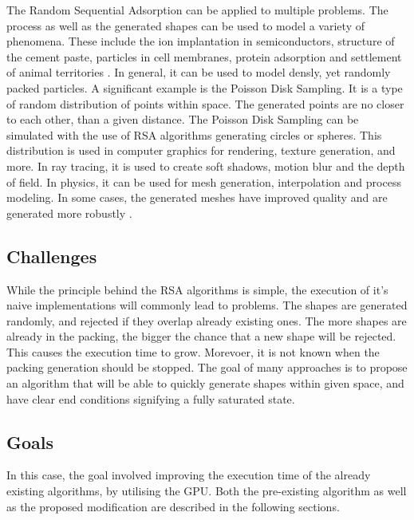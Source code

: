 \documentclass[12pt, oneside]{report}
\begin{document}
The Random Sequential Adsorption can be applied to multiple problems. The process as well as the generated shapes can be used to model a variety of phenomena. These include the ion implantation in semiconductors, structure of the cement paste, particles in cell membranes, protein adsorption and settlement of animal territories \cite{zhang}. In general, it can be used to model densly, yet randomly packed particles.\newline \newline
A significant example is the Poisson Disk Sampling. It is a type of random distribution of points within space. The generated points are no closer to each other, than a given distance. The Poisson Disk Sampling can be simulated with the use of RSA algorithms generating circles or spheres. \newline
This distribution is used in computer graphics for rendering, texture generation, and more. In ray tracing, it is used to create soft shadows, motion blur and the depth of field. In physics, it can be used for mesh generation, interpolation and process modeling. In some cases, the generated meshes have improved quality and are generated more robustly \cite{ebeida}.

\subsection {Challenges}

While the principle behind the RSA algorithms is simple, the execution of it's naive implementations will commonly lead to problems. The shapes are generated randomly, and rejected if they overlap already existing ones. The more shapes are already in the packing, the bigger the chance that a new shape will be rejected. This causes the execution time to grow. Morevoer, it is not known when the packing generation should be stopped. The goal of many approaches is to propose an algorithm that will be able to quickly generate shapes within given space, and have clear end conditions signifying a fully saturated state.

\subsection {Goals}

In this case, the goal involved improving the execution time of the already existing algorithms, by utilising the GPU. Both the pre-existing algorithm as well as the proposed modification are described in the following sections.
\end{document}
